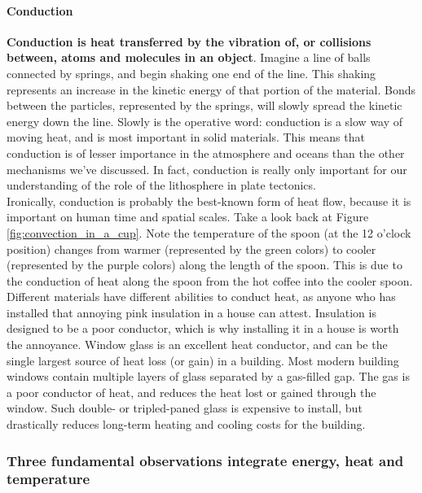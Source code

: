 \documentclass[amstex,12pt]{book}
\begin{document}
\paragraph{Conduction}
\textbf{Conduction is heat transferred by the vibration of, or collisions between, atoms and molecules in an object}. Imagine a line of balls connected by springs, and begin shaking one end of the line. This shaking represents an increase in the kinetic energy of that portion of the material. Bonds between the particles, represented by the springs, will slowly spread the kinetic energy down the line. Slowly is the operative word: conduction is a slow way of moving heat, and is most important in solid materials. This means that conduction is of lesser importance in the atmosphere and oceans than the other mechanisms we've discussed. In fact, conduction is really only important for our understanding of the role of the lithosphere in plate tectonics.\\

Ironically, conduction is probably the best-known form of heat flow, because it is important on human time and spatial scales. Take a look back at Figure \ref{fig:convection_in_a_cup}. Note the temperature of the spoon (at the 12 o'clock position) changes from warmer (represented by the green colors) to cooler (represented by the purple colors) along the length of the spoon. This is due to the conduction of heat along the spoon from the hot coffee into the cooler spoon. Different materials have different abilities to conduct heat, as anyone who has installed that annoying pink insulation in a house can attest. Insulation is designed to be a poor conductor, which is why installing it in a house is worth the annoyance. Window glass is an excellent heat conductor, and can be the single largest source of heat loss (or gain) in a building. Most modern building windows contain multiple layers of glass separated by a gas-filled gap. The gas is a poor conductor of heat, and reduces the heat lost or gained through the window. Such double- or tripled-paned glass is expensive to install, but drastically reduces long-term heating and cooling costs for the building.

\subsubsection{Three fundamental observations integrate energy, heat and temperature}
\end{document}
